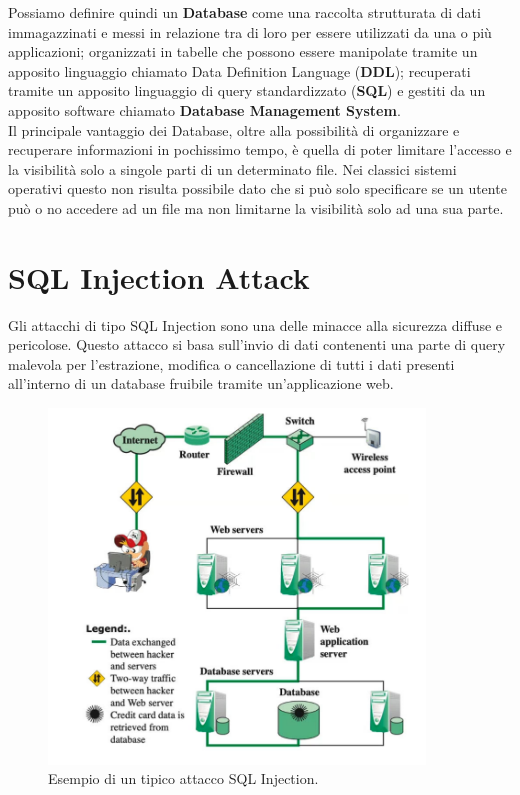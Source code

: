 Possiamo definire quindi un \textbf{Database} come una raccolta strutturata di
dati immagazzinati e messi in relazione tra di loro per essere utilizzati da una
o più applicazioni; organizzati in tabelle che possono essere manipolate tramite
un apposito linguaggio chiamato Data Definition Language (\textbf{DDL}); recuperati
tramite un apposito linguaggio di query standardizzato (\textbf{SQL}) e gestiti
da un apposito software chiamato \textbf{Database Management System}.\\

Il principale vantaggio dei Database, oltre alla possibilità di organizzare e
recuperare informazioni in pochissimo tempo, è quella di poter limitare l'accesso
e la visibilità solo a singole parti di un determinato file. Nei classici sistemi
operativi questo non risulta possibile dato che si può solo specificare se un
utente può o no accedere ad un file ma non limitarne la visibilità solo ad una
sua parte.

\section{SQL Injection Attack}

Gli attacchi di tipo SQL Injection sono una delle minacce alla sicurezza diffuse
e pericolose. Questo attacco si basa sull'invio di dati contenenti una
parte di query malevola per l'estrazione, modifica o cancellazione di tutti i
dati presenti all'interno di un database fruibile tramite un'applicazione web.

\begin{figure}[H]
    \centering
    \includegraphics[width=10cm, keepaspectratio]{capitoli/sql_security/imgs/sql1.png}
    \caption{Esempio di un tipico attacco SQL Injection.}
\end{figure}

